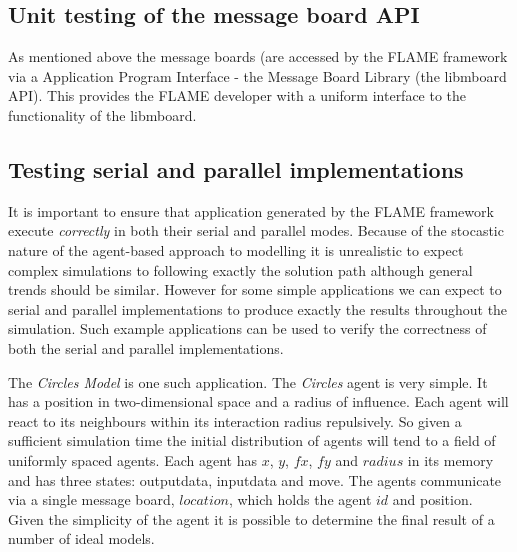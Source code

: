 \subsection{Unit testing of the message board API}
As mentioned above the message boards (are accessed by the FLAME framework via a Application Program Interface - the Message Board Library (the libmboard API). This provides the FLAME developer with a uniform interface to the functionality of the libmboard.
\subsection{Testing serial and parallel implementations}
It is important to ensure that application generated by the FLAME framework execute \textsl{correctly} in both their serial and parallel modes. Because of the stocastic nature of the agent-based approach to modelling it is unrealistic to expect complex simulations to following exactly the solution path although general trends should be similar. However for some simple applications we can expect to serial and parallel implementations to produce exactly the results throughout the simulation. Such example applications can be used to verify the correctness of both the serial and parallel implementations.

The \textsl{Circles Model} is one such application. The \textsl{Circles} agent is very simple. It has a position in two-dimensional space and a radius of influence. Each agent will react to its neighbours within its interaction radius repulsively. So given a sufficient simulation time the initial distribution of agents will tend to a field of uniformly spaced agents. Each agent has $x$, $y$, $fx$, $fy$ and $radius$ in its memory and has three states: outputdata, inputdata and move. The agents communicate via a single message board, $location$, which holds the agent $id$ and position. Given the simplicity of the agent it is possible to determine the final result of a number of ideal models.


